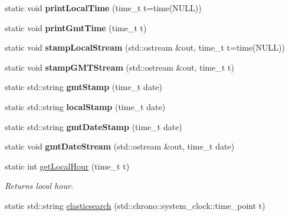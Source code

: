 \begin{DoxyCompactItemize}
\mbox{\label{classTimeStamp_a8389d7abcc32f5968bcb90f5ae2f8085}} 
static void {\bfseries print\+Local\+Time} (time\+\_\+t t=time(N\+U\+LL))
\item 
\mbox{\label{classTimeStamp_adbd535a4b445bd69dd74df0683dd3564}} 
static void {\bfseries print\+Gmt\+Time} (time\+\_\+t t)
\item 
\mbox{\label{classTimeStamp_a82ee3480042930181505d53e9db0c332}} 
static void {\bfseries stamp\+Local\+Stream} (std\+::ostream \&out, time\+\_\+t t=time(N\+U\+LL))
\item 
\mbox{\label{classTimeStamp_a0e271803e6a1e78e0b9ce53153e8bc08}} 
static void {\bfseries stamp\+G\+M\+T\+Stream} (std\+::ostream \&out, time\+\_\+t t)
\item 
\mbox{\label{classTimeStamp_a0b9e319e6726edb404512b10beb3ada3}} 
static std\+::string {\bfseries gmt\+Stamp} (time\+\_\+t date)
\item 
\mbox{\label{classTimeStamp_aed809a15affe0c123bf206691c91590c}} 
static std\+::string {\bfseries local\+Stamp} (time\+\_\+t date)
\item 
\mbox{\label{classTimeStamp_aa86478286cfd4cad9eb6769d0635ffd8}} 
static std\+::string {\bfseries gmt\+Date\+Stamp} (time\+\_\+t date)
\item 
\mbox{\label{classTimeStamp_aef5c0a89a29a921ff913c3d746201c20}} 
static void {\bfseries gmt\+Date\+Stream} (std\+::ostream \&out, time\+\_\+t date)
\item 
\mbox{\label{classTimeStamp_a89b3bc4a0fd6b62660ce135ceae9956a}} 
static int \hyperlink{classTimeStamp_a89b3bc4a0fd6b62660ce135ceae9956a}{get\+Local\+Hour} (time\+\_\+t t)
\begin{DoxyCompactList}\small\item\em Returns local hour. \end{DoxyCompactList}\item 
\mbox{\label{classTimeStamp_a45a43928c085dc5896aa546e0bb2010d}} 
static std\+::string \hyperlink{classTimeStamp_a45a43928c085dc5896aa546e0bb2010d}{elasticsearch} (std\+::chrono\+::system\+\_\+clock\+::time\+\_\+point t)

\end{DoxyCompactItemize}
